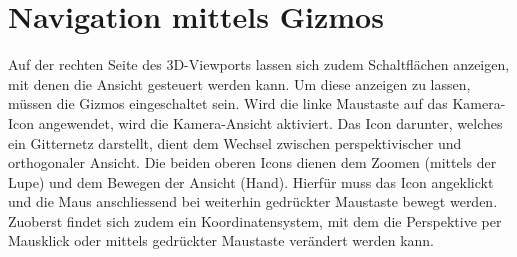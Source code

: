 \documentclass[
]{book}
\begin{document}
\section{Navigation mittels Gizmos}\label{navigation-mittels-gizmos}

Auf der rechten Seite des 3D-Viewports lassen sich zudem Schaltflächen
anzeigen, mit denen die Ansicht gesteuert werden kann. Um diese anzeigen
zu lassen, müssen die Gizmos eingeschaltet sein. Wird die linke
Maustaste auf das Kamera-Icon angewendet, wird die Kamera-Ansicht
aktiviert. Das Icon darunter, welches ein Gitternetz darstellt, dient
dem Wechsel zwischen perspektivischer und orthogonaler Ansicht. Die
beiden oberen Icons dienen dem Zoomen (mittels der Lupe) und dem Bewegen
der Ansicht (Hand). Hierfür muss das Icon angeklickt und die Maus
anschliessend bei weiterhin gedrückter Maustaste bewegt werden. Zuoberst
findet sich zudem ein Koordinatensystem, mit dem die Perspektive per
Mausklick oder mittels gedrückter Maustaste verändert werden kann.


\backmatter
\end{document}
